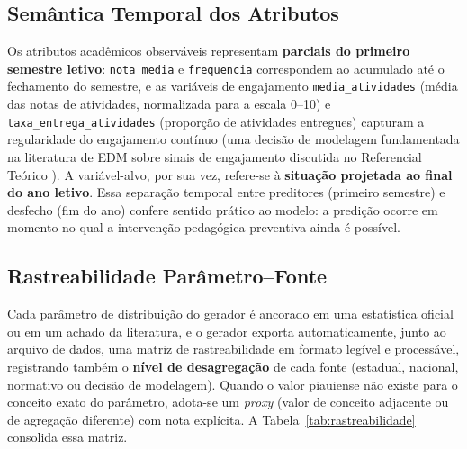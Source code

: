 \subsection{Semântica Temporal dos Atributos}
\label{sec:temporalidade}

Os atributos acadêmicos observáveis representam \textbf{parciais do primeiro semestre letivo}: \texttt{nota\_media} e \texttt{frequencia} correspondem ao acumulado até o fechamento do semestre, e as variáveis de engajamento \texttt{media\_atividades} (média das notas de atividades, normalizada para a escala 0--10) e \texttt{taxa\_entrega\_atividades} (proporção de atividades entregues) capturam a regularidade do engajamento contínuo (uma decisão de modelagem fundamentada na literatura de EDM sobre sinais de engajamento discutida no Referencial Teórico \cite{costa2012, fredricks2004}). A variável-alvo, por sua vez, refere-se à \textbf{situação projetada ao final do ano letivo}. Essa separação temporal entre preditores (primeiro semestre) e desfecho (fim do ano) confere sentido prático ao modelo: a predição ocorre em momento no qual a intervenção pedagógica preventiva ainda é possível.

\subsection{Rastreabilidade Parâmetro--Fonte}

Cada parâmetro de distribuição do gerador é ancorado em uma estatística oficial ou em um achado da literatura, e o gerador exporta automaticamente, junto ao arquivo de dados, uma matriz de rastreabilidade em formato legível e processável, registrando também o \textbf{nível de desagregação} de cada fonte (estadual, nacional, normativo ou decisão de modelagem). Quando o valor piauiense não existe para o conceito exato do parâmetro, adota-se um \textit{proxy} (valor de conceito adjacente ou de agregação diferente) com nota explícita. A Tabela~\ref{tab:rastreabilidade} consolida essa matriz.

